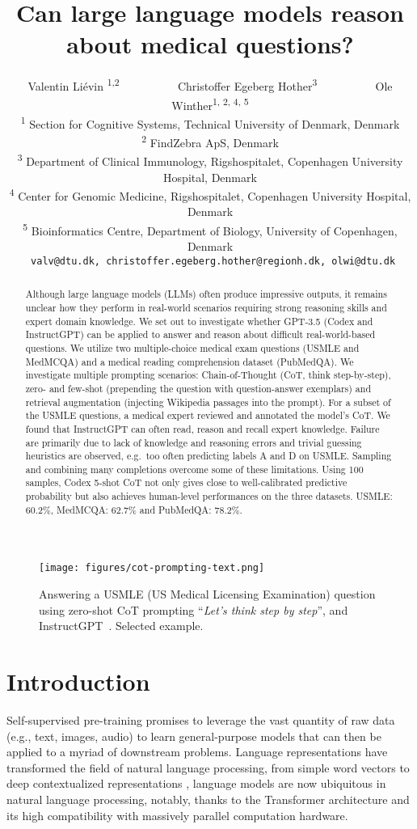\documentclass{article} \usepackage{iclr2022_conference,times}
\title{Can large language models reason about medical questions?}
\author{Valentin Li\'evin \textsuperscript{1,2} ~~~~~~~~~
Christoffer Egeberg Hother\textsuperscript{3} ~~~~~~~~~
Ole Winther\textsuperscript{1, 2, 4, 5}\\
\textsuperscript{1} Section for Cognitive Systems, Technical University of Denmark, Denmark\\ 
\textsuperscript{2} FindZebra ApS, Denmark\\ 
\textsuperscript{3} Department of Clinical Immunology, Rigshospitalet, Copenhagen University Hospital, Denmark \\
\textsuperscript{4} Center for Genomic Medicine, Rigshospitalet, Copenhagen University Hospital, Denmark \\
\textsuperscript{5} Bioinformatics Centre, Department of Biology, University of Copenhagen, Denmark\\
\texttt{~valv@dtu.dk,~christoffer.egeberg.hother@regionh.dk,~olwi@dtu.dk}
}
\newcommand{\PromptOne}{\textit{Let's think step by step}}
\begin{document}
\maketitle

\begin{abstract}


Although large language models (LLMs) often produce impressive outputs, it remains unclear how they perform in real-world scenarios requiring strong reasoning skills and expert domain knowledge. We set out to investigate whether GPT-3.5 (Codex and InstructGPT) can be applied to answer and reason about difficult real-world-based questions. We utilize two multiple-choice medical exam questions (USMLE and MedMCQA) and a medical reading comprehension dataset (PubMedQA).
We investigate multiple prompting scenarios: Chain-of-Thought (CoT, think step-by-step), zero- and few-shot (prepending the question with question-answer exemplars) and retrieval augmentation (injecting Wikipedia passages into the prompt). For a subset of the USMLE questions, a medical expert reviewed and annotated the model's CoT. We found that InstructGPT can often read, reason and recall expert knowledge. Failure are primarily due to lack of knowledge and reasoning errors and trivial guessing heuristics are observed, e.g.\ too often predicting labels A and D on USMLE. Sampling and combining many completions overcome some of these limitations. Using 100 samples, Codex 5-shot CoT not only gives close to well-calibrated predictive probability but also achieves human-level performances on the three datasets. USMLE: 60.2\%, MedMCQA: 62.7\% and PubMedQA: 78.2\%. 

\end{abstract}

\begin{figure}[h]
    \centering
    \caption{Answering a USMLE (US Medical Licensing Examination) question using zero-shot CoT prompting ``\PromptOne'', \cite{Kojima2022-wg} and InstructGPT~\citep{Ouyang2022-mh}. Selected example.}
    \label{fig:cot-prompting-text}
    \texttt{[image: figures/cot-prompting-text.png]}
\end{figure}

\section{Introduction}



Self-supervised pre-training promises to leverage the vast quantity of raw data (e.g., text, images, audio) to learn general-purpose models that can then be applied to a myriad of downstream problems. Language representations have transformed the field of natural language processing, from simple word vectors \citep{Mikolov2013-gj,Pennington2014-im} to deep contextualized representations \citep{Peters2018-hm, Vaswani2017-st, Devlin2018-qr, Radford2018-kq}, language models are now ubiquitous in natural language processing, notably, thanks to the Transformer architecture \citep{Vaswani2017-st} and its high compatibility with massively parallel computation hardware.
\end{document}
